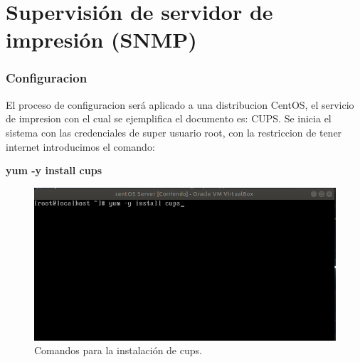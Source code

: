 \section{Supervisión de servidor de impresión (SNMP)}

\subsubsection{Configuracion}

El proceso de configuracion será aplicado a una distribucion CentOS, el servicio de impresion con el cual se ejemplifica el documento es: CUPS.
Se inicia el sistema con las credenciales de super usuario root, con la restriccion de tener internet introducimos el comando:
\\
\begin{center}
\textbf{yum -y install cups}
\end {center}
						
\FloatBarrier
\begin{figure}[htbp!]
		\centering
			\includegraphics[width=.8 \textwidth]{images/r1}
		\caption{Comandos para la instalación de cups.}
		\label{image:r1}
\end{figure}
\FloatBarrier

